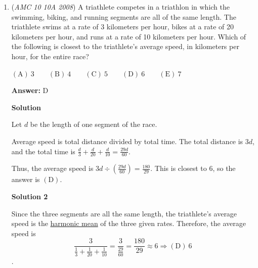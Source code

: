 \begin{enumerate}
 \textbf{Answer: }B



\textbf{Solution 1}

$\frac {8}{4}\cdot\frac {12}{8}\cdot\frac {16}{12}\cdots\frac {4n + 4}{4n}\cdots\frac {2008}{2004} = \frac {1}{4}\cdot\left(\frac {8}{8}\cdot\frac {12}{12}\cdots\frac {4n}{4n}\cdots\frac {2004}{2004}\right)\cdot 2008 = \frac{2008}{4} =$ $502 \Rightarrow B$. 

 



\textbf{Solution 2}

Notice that everything cancels out except for $2008$ in the numerator and $4$ in the denominator.

 Thus, the product is $\frac{2008}{4}=502$, and the answer is $\textbf{(B)}$. 

 


	\item (\textit{AMC 10 10A 2008}) A triathlete competes in a triathlon in which the swimming, biking, and running segments are all of the same length. The triathlete swims at a rate of 3 kilometers per hour, bikes at a rate of 20 kilometers per hour, and runs at a rate of 10 kilometers per hour. Which of the following is closest to the triathlete's average speed, in kilometers per hour, for the entire race?


 $\mathrm{(A)}\ 3\qquad\mathrm{(B)}\ 4\qquad\mathrm{(C)}\ 5\qquad\mathrm{(D)}\ 6\qquad\mathrm{(E)}\ 7$

 \textbf{Answer: }D



\textbf{Solution}

Let $d$ be the length of one segment of the race.

 Average speed is total distance divided by total time. The total distance is $3d$, and the total time is $\frac{d}{3}+\frac{d}{20}+\frac{d}{10}=\frac{29d}{60}$.

 Thus, the average speed is $3d\div\left(\frac{29d}{60}\right)=\frac{180}{29}$. This is closest to $6$, so the answer is $\mathrm{(D)}$.

 



\textbf{Solution 2}

Since the three segments are all the same length, the triathlete's average speed is the \href{https://artofproblemsolving.com/wiki/index.php?title=Harmonic\_mean}{harmonic mean} of the three given rates. Therefore, the average speed is 
 \[\frac{3}{\frac{1}{3}+\frac{1}{20}+\frac{1}{10}}=\frac{3}{\frac{29}{60}}=\frac{180}{29}\approx6\Rightarrow\boxed{\mathrm{(D)}\ 6}\].


\end{enumerate}
